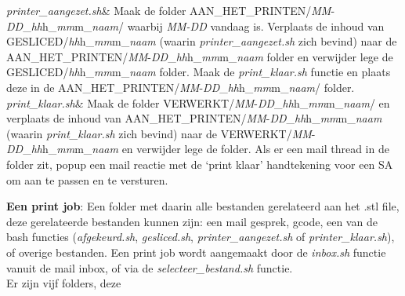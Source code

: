 \documentclass{article}
\begin{document}
\begin{table}[H]
\begin{tabular}
\textit{printer\_aangezet.sh}& 
Maak de folder AAN\_HET\_PRINTEN/\textit{MM}-\textit{DD}\_\textit{hh}h\_\textit{mm}m\_\textit{naam}/ waarbij \textit{MM-DD} vandaag is. Verplaats de inhoud van GESLICED/\textit{hh}h\_\textit{mm}m\_\textit{naam} (waarin \textit{printer\_aangezet.sh} zich bevind) naar de AAN\_HET\_PRINTEN/\textit{MM}-\textit{DD}\_\textit{hh}h\_\textit{mm}m\_\textit{naam} folder en verwijder lege de GESLICED/\textit{hh}h\_\textit{mm}m\_\textit{naam} folder. Maak de \textit{print\_klaar.sh} functie en plaats deze in de AAN\_HET\_PRINTEN/\textit{MM}-\textit{DD}\_\textit{hh}h\_\textit{mm}m\_\textit{naam}/ folder.\\

\textit{print\_klaar.sh}& Maak de folder VERWERKT/\textit{MM}-\textit{DD}\_\textit{hh}h\_\textit{mm}m\_\textit{naam}/ en verplaats de inhoud van AAN\_HET\_PRINTEN/\textit{MM}-\textit{DD}\_\textit{hh}h\_\textit{mm}m\_\textit{naam} (waarin \textit{print\_klaar.sh} zich bevind) naar de VERWERKT/\textit{MM}-\textit{DD}\_\textit{hh}h\_\textit{mm}m\_\textit{naam} en verwijder lege de folder. Als er een mail thread in de folder zit, popup een mail reactie met de `print klaar' handtekening voor een SA om aan te passen en te versturen.\\

    \end{tabular}
\end{table}

\noindent\textbf{Een print job}: Een folder met daarin alle bestanden gerelateerd aan het .stl file, deze gerelateerde bestanden kunnen zijn: een mail gesprek, gcode, een van de bash functies (\textit{afgekeurd.sh}, \textit{gesliced.sh}, \textit{printer\_aangezet.sh} of \textit{printer\_klaar.sh}), of overige bestanden. Een print job wordt aangemaakt door de \textit{inbox.sh} functie vanuit de mail inbox, of via de \textit{selecteer\_bestand.sh} functie.\\

Er zijn vijf folders, deze 
\end{document}
